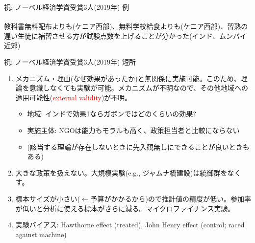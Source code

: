 \begin{frame}{祝: ノーベル経済学賞受賞3人(2019年)}
例\\
\hfil{}\\

教科書無料配布よりも(ケニア西部)、無料学校給食よりも(ケニア西部)、習熟の遅い生徒に補習させる方が試験点数を上げることが分かった(インド、ムンバイ近郊)
\end{frame}
\begin{frame}[t]{祝: ノーベル経済学賞受賞3人(2019年)}
短所
\begin{enumerate}
\vspace{1.0ex}\setlength{\itemsep}{1.0ex}\setlength{\baselineskip}{12pt}
\item	メカニズム・理由(なぜ効果があったか)と無関係に実施可能。このため、理論を意識しなくても実験が可能。メカニズムが不明なので、その他地域への適用可能性(\textcolor{red}{external validity})が不明。
	\begin{itemize}
	\vspace{1.0ex}\setlength{\itemsep}{1.0ex}\setlength{\baselineskip}{12pt}
\pause
	\item	地域: インドで効果1ならガボンではどのくらいの効果?
\pause
	\item	実施主体: NGOは能力もモラルも高く、政策担当者と比較にならない
\pause
	\item	(該当する理論が存在しないときに先入観無しにできることが良いときもある)
	\end{itemize}
\pause
\item	大きな政策を扱えない。大規模実験(e.g., ジャムナ橋建設)は統御群をなくす。
\pause
\item	標本サイズが小さい($\leftarrow$予算がかかるから)ので推計値の精度が低い。参加率が低いと分析に使える標本がさらに減る。マイクロファイナンス実験。
\pause
\item	実験バイアス: Hawthorne effect (treated), John Henry effect (control; raced against machine)
\end{enumerate}
\end{frame}

